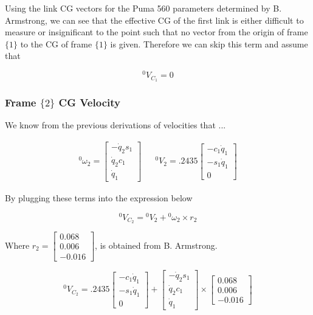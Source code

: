 Using the link CG vectors for the Puma 560 parameters determined by B. Armstrong, we can see that the effective  CG of the first link is either difficult to measure or insignificant to the point such that no vector from the origin of frame $\{ 1 \}$ to the CG of frame $\{ 1 \}$ is given. Therefore we can skip this term and assume that


$$
{}^{0}V_{C_1}=0
$$


\subsubsection*{Frame $\{ 2 \}$ CG Velocity}

We know from the previous derivations of velocities that ...

\begin{center}
  \begin{align*}
    {}^{0}\omega_2 = \left[\begin{array}{c} -\dot{q}_{2}s_{1} \\ \dot{q}_{2}c_{1} \\ \dot{q}_{1}
    \end{array}\right]
    &&
    {}^{0}V_{2} = .2435 \begin{bmatrix} -c_1\dot{q}_1 \\ -s_1\dot{q}_1 \\ 0\end{bmatrix}
  \end{align*}
\end{center}

\noindent By plugging these terms into the expression below

$$
{}^{0}V_{C_{2}} = {}^{0}V_{2} + {}^{0}\omega_2 \times r_2
$$


\noindent Where $r_2 = \begin{bmatrix}
0.068 \\ 0.006 \\ -0.016
\end{bmatrix}
$, is obtained from B. Armstrong.


$$
{}^{0}V_{C_{2}} = .2435 \begin{bmatrix} -c_1\dot{q}_1 \\ -s_1\dot{q}_1 \\ 0\end{bmatrix} + \left[\begin{array}{c} -\dot{q}_{2}s_{1} \\ \dot{q}_{2}c_{1} \\ \dot{q}_{1}
\end{array}\right] \times \begin{bmatrix}
0.068 \\ 0.006 \\ -0.016
\end{bmatrix}
$$


